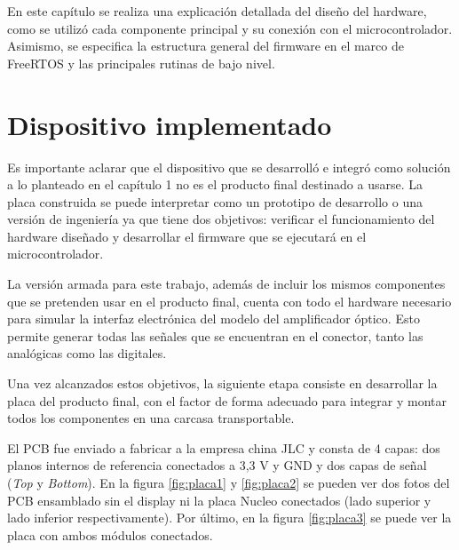 
En este capítulo se realiza una explicación detallada del diseño del hardware, como se utilizó cada componente principal y su conexión con el microcontrolador. Asimismo, se especifica la estructura general del firmware en el marco de FreeRTOS y las principales rutinas de bajo nivel.

\section{Dispositivo implementado}
\label{sec:dispImp}

Es importante aclarar que el dispositivo que se desarrolló e integró como solución a lo planteado en el capítulo 1 no es el producto final destinado a usarse. La placa construida se puede interpretar como un prototipo de desarrollo o una versión de ingeniería ya que tiene dos objetivos: verificar el funcionamiento del hardware diseñado y desarrollar el firmware que se ejecutará en el microcontrolador. 

La versión armada para este trabajo, además de incluir los mismos componentes que se pretenden usar en el producto final, cuenta con todo el hardware necesario para simular la interfaz electrónica del modelo del amplificador óptico. Esto permite generar todas las señales que se encuentran en el conector, tanto las analógicas como las digitales.

Una vez alcanzados estos objetivos, la siguiente etapa consiste en desarrollar la placa del producto final, con el factor de forma adecuado para integrar y montar todos los componentes en una carcasa transportable. 

El PCB fue enviado a fabricar a la empresa china JLC y consta de 4 capas: dos planos internos de referencia conectados a 3,3 V y GND y dos capas de señal (\textit{Top} y \textit{Bottom}). En la figura \ref{fig:placa1} y \ref{fig:placa2} se pueden ver dos fotos del PCB ensamblado sin el display ni la placa Nucleo conectados (lado superior y lado inferior respectivamente). Por último, en la figura \ref{fig:placa3} se puede ver la placa con ambos módulos conectados.

